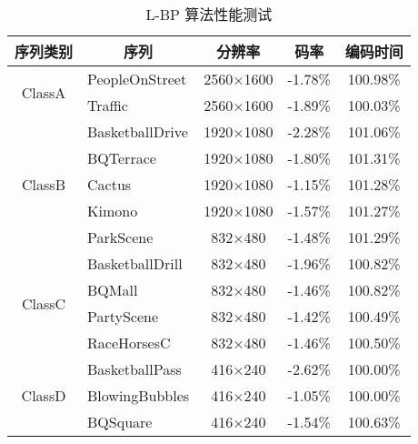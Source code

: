\begin{table}[!p]
    \centering
    \caption{L-BP 算法性能测试}
    \label{tab:L-BPSummary}
    \begin{tabular}{clccc}
        \toprule
        序列类别                               & \multicolumn{1}{c}{序列}     & 分辨率           & 码率     & 编码时间 \\ \midrule
        \multirow{2}{*}{ClassA}                & PeopleOnStreet               & 2560$\times$1600 & -1.78\%  & 100.98\% \\
                                               & Traffic                      & 2560$\times$1600 & -1.89\%  & 100.03\% \\
        \multirow{5}{*}{ClassB}                & BasketballDrive              & 1920$\times$1080 & -2.28\%  & 101.06\% \\
                                               & BQTerrace                    & 1920$\times$1080 & -1.80\%  & 101.31\% \\
                                               & Cactus                       & 1920$\times$1080 & -1.15\%  & 101.28\% \\
                                               & Kimono                       & 1920$\times$1080 & -1.57\%  & 101.27\% \\
                                               & ParkScene                    & 832$\times$480   & -1.48\%  & 101.29\% \\
        \multirow{4}{*}{ClassC}                & BasketballDrill              & 832$\times$480   & -1.96\%  & 100.82\% \\
                                               & BQMall                       & 832$\times$480   & -1.46\%  & 100.82\% \\
                                               & PartyScene                   & 832$\times$480   & -1.42\%  & 100.49\% \\
                                               & RaceHorsesC                  & 832$\times$480   & -1.46\%  & 100.50\% \\
        \multirow{4}{*}{ClassD}                & BasketballPass               & 416$\times$240   & -2.62\%  & 100.00\% \\
                                               & BlowingBubbles               & 416$\times$240   & -1.05\%  & 100.00\% \\
                                               & BQSquare                     & 416$\times$240   & -1.54\%  & 100.63\% \\

\end{tabular}
\end{table}
